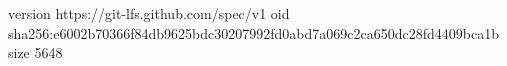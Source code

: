 version https://git-lfs.github.com/spec/v1
oid sha256:e6002b70366f84db9625bdc30207992fd0abd7a069c2ca650dc28fd4409bca1b
size 5648
